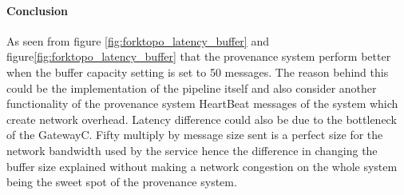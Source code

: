 \paragraph*{Conclusion}
As seen from figure \ref{fig:forktopo_latency_buffer} and figure\ref{fig:forktopo_latency_buffer} that the provenance system perform better when the buffer capacity setting is set to 50 messages. The reason behind this could be the implementation of the pipeline itself and also consider another functionality of the provenance system HeartBeat messages of the system which create network overhead. Latency difference could also be due to the bottleneck of the GatewayC. Fifty multiply by message size sent is a perfect size for the network bandwidth used by the service hence the difference in changing the buffer size explained without making a network congestion on the whole system being the sweet spot of the provenance system.